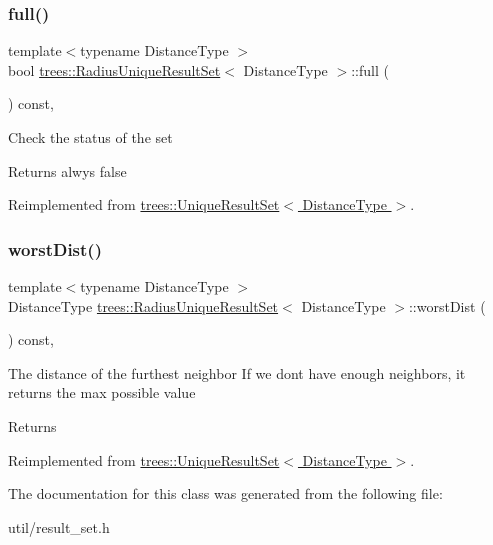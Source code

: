 \subsubsection{\texorpdfstring{full()}{full()}}
{\footnotesize\ttfamily template$<$typename Distance\+Type $>$ \\
bool \hyperlink{classtrees_1_1_radius_unique_result_set}{trees\+::\+Radius\+Unique\+Result\+Set}$<$ Distance\+Type $>$\+::full (\begin{DoxyParamCaption}{ }\end{DoxyParamCaption}) const\hspace{0.3cm}{\ttfamily [inline]}, {\ttfamily [virtual]}}

Check the status of the set \begin{DoxyReturn}{Returns}
alwys false 
\end{DoxyReturn}


Reimplemented from \hyperlink{classtrees_1_1_unique_result_set_a6c10f8635c22eaecaa7e6fda3afea132}{trees\+::\+Unique\+Result\+Set$<$ Distance\+Type $>$}.

\mbox{\label{classtrees_1_1_radius_unique_result_set_af0f7ec26a6515cb085df64a43afe433c}} 
\subsubsection{\texorpdfstring{worst\+Dist()}{worstDist()}}
{\footnotesize\ttfamily template$<$typename Distance\+Type $>$ \\
Distance\+Type \hyperlink{classtrees_1_1_radius_unique_result_set}{trees\+::\+Radius\+Unique\+Result\+Set}$<$ Distance\+Type $>$\+::worst\+Dist (\begin{DoxyParamCaption}{ }\end{DoxyParamCaption}) const\hspace{0.3cm}{\ttfamily [inline]}, {\ttfamily [virtual]}}

The distance of the furthest neighbor If we don\textquotesingle{}t have enough neighbors, it returns the max possible value \begin{DoxyReturn}{Returns}

\end{DoxyReturn}


Reimplemented from \hyperlink{classtrees_1_1_unique_result_set_a2301eba6dae87959cc50668dd2307d4d}{trees\+::\+Unique\+Result\+Set$<$ Distance\+Type $>$}.



The documentation for this class was generated from the following file\+:\begin{DoxyCompactItemize}
\item 
util/result\+\_\+set.\+h\end{DoxyCompactItemize}
